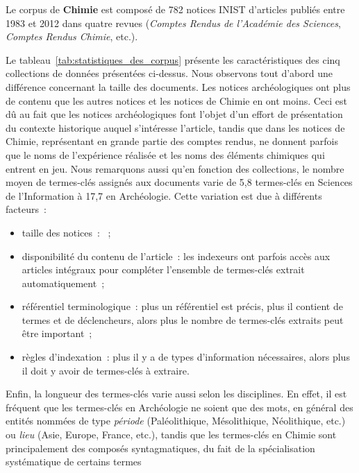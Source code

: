   Le corpus de \textbf{Chimie} est composé de 782 notices INIST d'articles
  publiés entre 1983 et 2012 dans quatre revues (\textit{Comptes Rendus de
  l'Académie des Sciences}, \textit{Comptes Rendus Chimie}, etc.).

  Le tableau~\ref{tab:statistiques_des_corpus} présente les caractéristiques des
  cinq collections de données présentées ci-dessus. Nous observons tout d'abord
  une différence concernant la taille des documents. Les notices archéologiques
  ont plus de contenu que les autres notices et les notices de Chimie en ont
  moins. Ceci est dû au fait que les notices archéologiques font l'objet d'un
  effort de présentation du contexte historique auquel s'intéresse l'article,
  tandis que dans les notices de Chimie, représentant en grande partie des
  comptes rendus, ne donnent parfois que le noms de l'expérience réalisée et
  les noms des éléments chimiques qui entrent en jeu. Nous remarquons aussi
  qu'en fonction des collections, le nombre moyen de termes-clés assignés aux
  documents varie de 5,8 termes-clés en Sciences de l'Information à 17,7 en
  Archéologie. Cette variation est due à différents facteurs~:
  \begin{itemize}
    \item{taille des notices~: ~;}
    \item{disponibilité du contenu de l'article~: les indexeurs ont parfois
          accès aux articles intégraux pour compléter l'ensemble de termes-clés
          extrait automatiquement~;}
    \item{référentiel terminologique~: plus un référentiel est précis, plus il
          contient de termes et de déclencheurs, alors plus le nombre de
          termes-clés extraits peut être important~;}
    \item{règles d'indexation~: plus il y a de types d'information nécessaires,
          alors plus il doit y avoir de termes-clés à extraire.}
  \end{itemize}
  Enfin, la longueur des termes-clés varie aussi selon les disciplines. En
  effet, il est fréquent que les termes-clés en Archéologie ne soient que des
  mots, en général des entités nommées de type \textit{période}
  (\og{}Paléolithique\fg{}, \og{}Mésolithique\fg{}, \og{}Néolithique\fg{}, etc.)
  ou \textit{lieu} (\og{}Asie\fg{}, \og{}Europe\fg{}, \og{}France\fg{}, etc.),
  tandis que les termes-clés en Chimie sont principalement des composés
  syntagmatiques, du fait de la spécialisation systématique de certains termes
